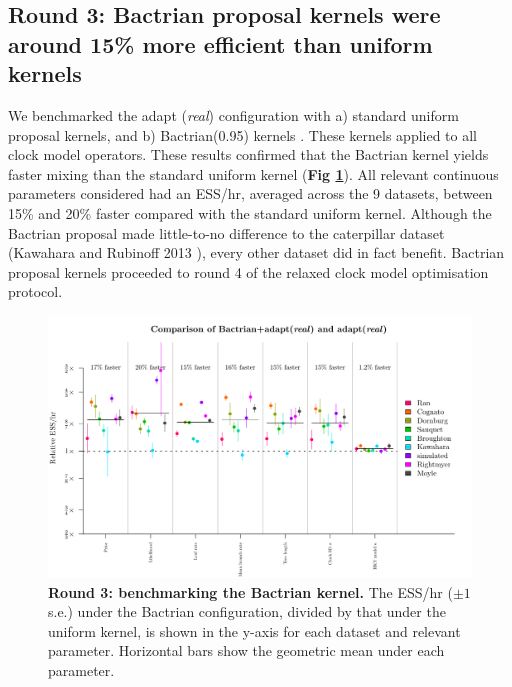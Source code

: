 \documentclass[10pt,letterpaper]{article}
\begin{document}



\subsection*{Round 3: Bactrian proposal kernels were around 15\% more efficient than uniform kernels}


We benchmarked the adapt (\textit{real}) configuration with a) standard uniform proposal kernels, and b) Bactrian(0.95) kernels \cite{yang2013searching}.
These kernels applied to all clock model operators.
These results confirmed that the Bactrian kernel yields faster mixing than the standard uniform kernel (\textbf{Fig \ref{fig:round3Results}}).
All relevant continuous parameters considered had an ESS/hr, averaged across the 9 datasets, between 15\% and 20\% faster compared with the standard uniform kernel.
Although the Bactrian proposal made little-to-no difference to the caterpillar dataset (Kawahara and Rubinoff 2013 \cite{Kawahara_2013}), every other dataset did in fact benefit.
Bactrian proposal kernels proceeded to round 4 of the relaxed clock model optimisation protocol. 




\begin{figure}[!h]
\includegraphics[width=\textwidth]{benchmarking/benchmarkingVM/ESS_round3.pdf}
\caption{\textbf{Round 3: benchmarking the Bactrian kernel.}
The ESS/hr ($\pm 1$ s.e.) under the Bactrian configuration, divided by that under the uniform kernel, is shown in the y-axis for each dataset and relevant parameter.
Horizontal bars show the geometric mean under each parameter.
 }
\label{fig:round3Results}
\end{figure}
\end{document}
